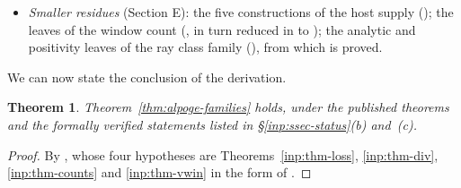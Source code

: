 \documentclass[10pt]{amsart}
\newtheorem{theorem}{Theorem}[section]
\theoremstyle{definition}
\theoremstyle{remark}
\begin{document}
\begin{itemize}
$$chain-tied, that is, that their data form column packages satisfying
(1)--(5) of Theorem~\ref{thm:alpoge-families}(b).
\item \emph{Smaller residues} (Section E): the five constructions of the
host supply (\cite[Propositions~\ref{A-i4:Sprop-field}, \ref{A-i4:Sprop-win},
\ref{A-i4:Sprop-ranks}, \ref{A-i4:Sprop-host}, \ref{A-i4:Sprop-tw}]{Annex}); the
leaves of the window count (\cite[Proposition~\ref{A-i4:Rprop-window-leaves}]{Annex},
in turn reduced in \cite{Annex} to \cite[Propositions~\ref{A-i4:Rprop-kappaI},
\ref{A-i4:Rprop-num}]{Annex}); the analytic and positivity leaves of the ray
class family (\cite[Proposition~\ref{A-i4:prop-ray-leaves}]{Annex}), from
which \cite[Proposition~\ref{A-i4:prop-lfam-ray}]{Annex} is proved.
\end{itemize}

We can now state the conclusion of the derivation.

\begin{theorem}\label{inp:thm-families}
Theorem~\ref{thm:alpoge-families} holds, under the published theorems and
the formally verified statements listed in \S\ref{inp:ssec-status}(b)
and~(c).
\end{theorem}

\begin{proof}
By \cite[Theorem~\ref{A-i4:thm-final}]{Annex}, whose four hypotheses are
Theorems~\ref{inp:thm-loss}, \ref{inp:thm-div}, \ref{inp:thm-counts} and
\ref{inp:thm-vwin} in the form of \cite[Propositions~\ref{A-i4:hyp-loss},
\ref{A-i4:hyp-div}, \ref{A-i4:hyp-S}, \ref{A-i4:hyp-selmer}]{Annex}.
\end{proof}
\end{document}
